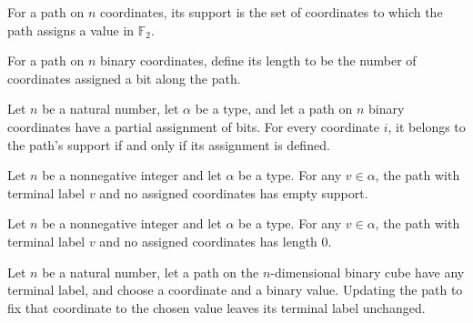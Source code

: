 \begin{definition}
\leanok
{}
For a path on $n$ coordinates, its support is the set of coordinates to which the path
assigns a value in $\mathbb{F}_2$.
\end{definition}

\begin{definition}
\leanok
{}
For a path on $n$ binary coordinates, define its length to be the number of coordinates
assigned a bit along the path.
\end{definition}

\begin{theorem}
\leanok
{}
Let $n$ be a natural number, let $\alpha$ be a type, and let a path on $n$ binary
coordinates have a partial assignment of bits. For every coordinate $i$, it belongs to
the path's support if and only if its assignment is defined.
\end{theorem}

\begin{theorem}
\leanok
{}
Let $n$ be a nonnegative integer and let $\alpha$ be a type. For any $v\in\alpha$, the
path with terminal label $v$ and no assigned coordinates has empty support.
\end{theorem}

\begin{theorem}
\leanok
{}
Let $n$ be a nonnegative integer and let $\alpha$ be a type. For any $v\in\alpha$, the
path with terminal label $v$ and no assigned coordinates has length $0$.
\end{theorem}

\begin{theorem}
\leanok
{}
Let $n$ be a natural number, let a path on the $n$-dimensional binary cube have any
terminal label, and choose a coordinate and a binary value. Updating the path to fix
that coordinate to the chosen value leaves its terminal label unchanged.
\end{theorem}


